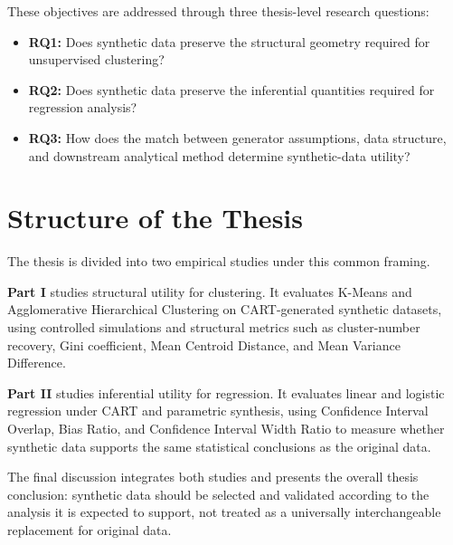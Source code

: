 These objectives are addressed through three thesis-level research questions:
\begin{itemize}
  \item \textbf{RQ1:} Does synthetic data preserve the structural geometry required for unsupervised clustering?
  \item \textbf{RQ2:} Does synthetic data preserve the inferential quantities required for regression analysis?
  \item \textbf{RQ3:} How does the match between generator assumptions, data structure, and downstream analytical method determine synthetic-data utility?
\end{itemize}

\section{Structure of the Thesis}
\label{sec:general-structure}

The thesis is divided into two empirical studies under this common framing.

\textbf{Part I} studies structural utility for clustering. It evaluates K-Means and Agglomerative Hierarchical Clustering on CART-generated synthetic datasets, using controlled simulations and structural metrics such as cluster-number recovery, Gini coefficient, Mean Centroid Distance, and Mean Variance Difference.

\textbf{Part II} studies inferential utility for regression. It evaluates linear and logistic regression under CART and parametric synthesis, using Confidence Interval Overlap, Bias Ratio, and Confidence Interval Width Ratio to measure whether synthetic data supports the same statistical conclusions as the original data.

The final discussion integrates both studies and presents the overall thesis conclusion: synthetic data should be selected and validated according to the analysis it is expected to support, not treated as a universally interchangeable replacement for original data.
